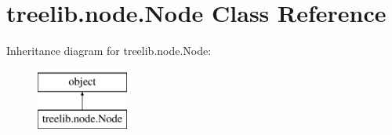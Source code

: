 \hypertarget{classtreelib_1_1node_1_1Node}{}\section{treelib.\+node.\+Node Class Reference}
\label{classtreelib_1_1node_1_1Node}
Inheritance diagram for treelib.\+node.\+Node\+:\begin{figure}[H]
\begin{center}
\leavevmode
\includegraphics[height=2.000000cm]{classtreelib_1_1node_1_1Node}
\end{center}
\end{figure}
